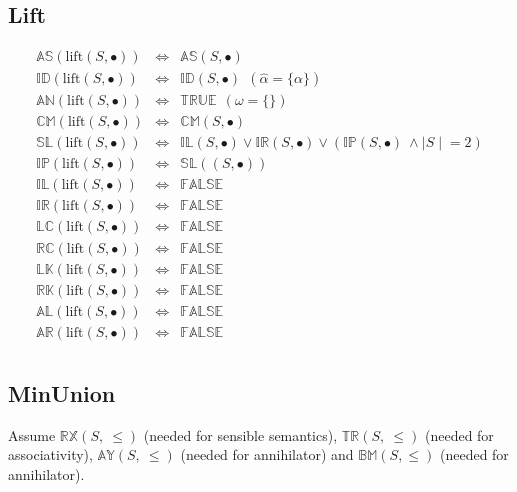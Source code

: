 \documentclass[10pt]{article}
\newcommand{\propname}[1]{{\mathbb{#1}}}
\begin{document}
\subsection{Lift} 
\[
\begin{array}{rcl} 
\propname{AS}(\mathrm{lift}(S, \bullet)) 
   & \Leftrightarrow 
   & \propname{AS}(S, \bullet) \\ 
\propname{ID}(\mathrm{lift}(S, \bullet)) 
   & \Leftrightarrow 
   & \propname{ID}(S, \bullet)  \ \ (\hat{\alpha} = \{\alpha\})\\ 
\propname{AN}(\mathrm{lift}(S, \bullet)) 
   & \Leftrightarrow 
   & \propname{TRUE} \ \ (\omega = \{\})\\ 
\propname{CM}(\mathrm{lift}(S, \bullet)) 
   & \Leftrightarrow 
   & \propname{CM}(S, \bullet) \\ 
\propname{SL}(\mathrm{lift}(S, \bullet)) 
   & \Leftrightarrow 
   & \propname{IL}(S, \bullet) 
     \vee \propname{IR}(S, \bullet) 
     \vee (\propname{IP}(S, \bullet)\ \wedge {\mid S \mid} = 2) \\ 
\propname{IP}(\mathrm{lift}(S, \bullet)) 
   & \Leftrightarrow 
   & \propname{SL}((S, \bullet)) \\ 
\propname{IL}(\mathrm{lift}(S, \bullet)) 
   & \Leftrightarrow 
   & \propname{FALSE} \\ 
\propname{IR}(\mathrm{lift}(S, \bullet)) 
   & \Leftrightarrow 
   & \propname{FALSE} \\ 
\propname{LC}(\mathrm{lift}(S, \bullet)) 
   & \Leftrightarrow 
   & \propname{FALSE} \\ 
\propname{RC}(\mathrm{lift}(S, \bullet)) 
   & \Leftrightarrow 
   & \propname{FALSE} \\ 
\propname{LK}(\mathrm{lift}(S, \bullet)) 
   & \Leftrightarrow 
   & \propname{FALSE} \\ 
\propname{RK}(\mathrm{lift}(S, \bullet)) 
   & \Leftrightarrow 
   & \propname{FALSE} \\  
\propname{AL}(\mathrm{lift}(S, \bullet))  
   & \Leftrightarrow 
   & \propname{FALSE} \\
\propname{AR}(\mathrm{lift}(S, \bullet))  
   & \Leftrightarrow 
   & \propname{FALSE} \\ 
\end{array} 
\]

\subsection{MinUnion} 

Assume $\propname{RX}(S,\ \leq)$ (needed for sensible semantics), $\propname{TR}(S,\ \leq)$ (needed for associativity), $\propname{AY}(S,\ \leq)$ (needed for annihilator) and $\propname{BM}(S,\leq)$ (needed for annihilator).
\end{document}
